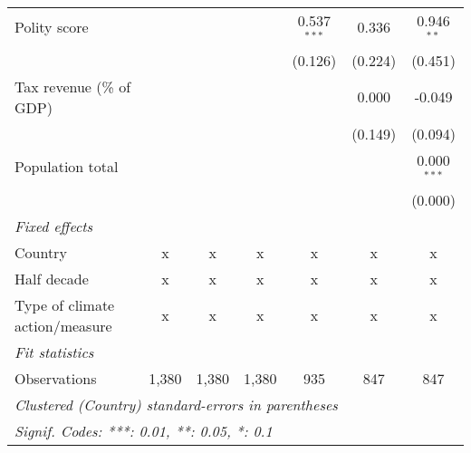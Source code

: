 \begin{tabular}{lcccccc}
   Polity score                                                             &         &         &               & 0.537$^{***}$  & 0.336         & 0.946$^{**}$\\   
                                                                            &         &         &               & (0.126)        & (0.224)       & (0.451)\\   
   Tax revenue (\% of GDP)                                                  &         &         &               &                & 0.000         & -0.049\\   
                                                                            &         &         &               &                & (0.149)       & (0.094)\\   
   Population total                                                         &         &         &               &                &               & 0.000$^{***}$\\   
                                                                            &         &         &               &                &               & (0.000)\\   
   \emph{Fixed effects}\\
   Country                                                                  & x       & x       & x             & x              & x             & x\\  
   Half decade                                                              & x       & x       & x             & x              & x             & x\\  
   Type of climate action/measure                                           & x       & x       & x             & x              & x             & x\\  
   \midrule \emph{Fit statistics}\\
   Observations                                                             & 1,380   & 1,380   & 1,380         & 935            & 847           & 847\\  
   \midrule
   \multicolumn{7}{l}{\emph{Clustered (Country) standard-errors in parentheses}}\\
   \multicolumn{7}{l}{\emph{Signif. Codes: ***: 0.01, **: 0.05, *: 0.1}}\\
\end{tabular}
\par\endgroup


